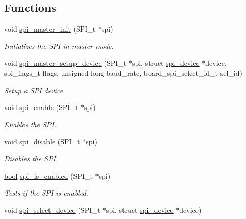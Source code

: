 \subsection*{Functions}
\begin{DoxyCompactItemize}
\item 
void \hyperlink{group__xmega__spi__master__group_ga3238676989038a9dec0ebcd3aa625a42}{spi\-\_\-master\-\_\-init} (S\-P\-I\-\_\-t $\ast$spi)
\begin{DoxyCompactList}\small\item\em Initializes the S\-P\-I in master mode. \end{DoxyCompactList}\item 
void \hyperlink{group__xmega__spi__master__group_ga81164f6dd2297a64337f3a052171e0f8}{spi\-\_\-master\-\_\-setup\-\_\-device} (S\-P\-I\-\_\-t $\ast$spi, struct \hyperlink{structspi__device}{spi\-\_\-device} $\ast$device, spi\-\_\-flags\-\_\-t flags, unsigned long baud\-\_\-rate, board\-\_\-spi\-\_\-select\-\_\-id\-\_\-t sel\-\_\-id)
\begin{DoxyCompactList}\small\item\em Setup a S\-P\-I device. \end{DoxyCompactList}\item 
void \hyperlink{group__xmega__spi__master__group_ga82974e81370360e53b1276113de8a462}{spi\-\_\-enable} (S\-P\-I\-\_\-t $\ast$spi)
\begin{DoxyCompactList}\small\item\em Enables the S\-P\-I. \end{DoxyCompactList}\item 
void \hyperlink{group__xmega__spi__master__group_gaea58710ce1a779f0eb234f24094b0120}{spi\-\_\-disable} (S\-P\-I\-\_\-t $\ast$spi)
\begin{DoxyCompactList}\small\item\em Disables the S\-P\-I. \end{DoxyCompactList}\item 
\hyperlink{group__group__xmega__utils_ga97a80ca1602ebf2303258971a2c938e2}{bool} \hyperlink{group__xmega__spi__master__group_ga7d25f0b8b0b0eef0e71123d90d5f58c2}{spi\-\_\-is\-\_\-enabled} (S\-P\-I\-\_\-t $\ast$spi)
\begin{DoxyCompactList}\small\item\em Tests if the S\-P\-I is enabled. \end{DoxyCompactList}\item 
void \hyperlink{group__xmega__spi__master__group_gac8751c855b90ea2774b5007f519e487e}{spi\-\_\-select\-\_\-device} (S\-P\-I\-\_\-t $\ast$spi, struct \hyperlink{structspi__device}{spi\-\_\-device} $\ast$device)

\end{DoxyCompactItemize}
